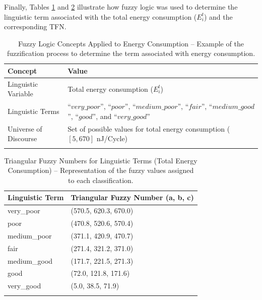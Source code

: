 \documentclass[iicol]{sn-jnl}
\begin{document}
Finally, Tables \ref{tab_ex_concepts_energy} and \ref{tab_fuzzy_numbers_energy} illustrate how fuzzy logic was used to determine the linguistic term associated with the total energy consumption ($E^t_i$) and the corresponding TFN.


\begin{table}[!ht]
    \renewcommand{\arraystretch}{1.3}
    \setlength{\tabcolsep}{2.5pt}
    \caption{Fuzzy Logic Concepts Applied to Energy Consumption – Example of the fuzzification process to determine the term associated with energy consumption.
    }\label{tab_ex_concepts_energy}
    \centering
        \begin{tabular}{lp{\twocolumns}}
        \toprule
         \bfseries Concept & \bfseries Value \\
         \midrule
         Linguistic Variable & Total energy consumption ($E^t_i$)\\
         Linguistic Terms &``$very\_poor$'', ``$poor$'', ``$medium\_poor$'', ``$fair$'', ``$medium\_good$'', ``$good$'', and ``$very\_good$'' \\
         Universe of Discourse & Set of possible values for total energy consumption ($[5, 670]$ nJ/Cycle) \\
        \botrule
        \end{tabular}
\end{table}

\begin{table}[!ht]
    \centering
    \caption{Triangular Fuzzy Numbers for Linguistic Terms (Total Energy Consumption) – Representation of the fuzzy values assigned to each classification.
    }
    \label{tab_fuzzy_numbers_energy}
    \begin{tabular}{lp{\twocolumns}}
        \toprule
        \textbf{Linguistic Term} & \textbf{Triangular Fuzzy Number (a, b, c)} \\
        \midrule
        very\_poor &  (570.5, 620.3, 670.0) \\
        poor & (470.8, 520.6, 570.4) \\
        medium\_poor & (371.1, 420.9, 470.7) \\
        fair & (271.4, 321.2, 371.0) \\
        medium\_good & (171.7, 221.5, 271.3) \\
        good & (72.0, 121.8, 171.6) \\
        very\_good & (5.0, 38.5, 71.9) \\
        \botrule
    \end{tabular}
\end{table}
\end{document}
